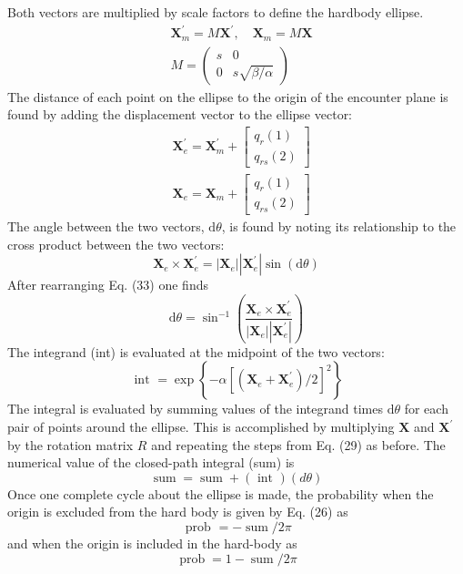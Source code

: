 \documentclass[10pt]{article}
\begin{document}
Both vectors are multiplied by scale factors to define the hardbody ellipse.
$$
\begin{aligned}
& \boldsymbol{X}_{m}^{\prime}=M \boldsymbol{X}^{\prime}, \quad \boldsymbol{X}_{m}=M \boldsymbol{X} \\
& M=\left(\begin{array}{cc}s & 0 \\0 & s \sqrt{\beta / \alpha}\end{array}\right)
\end{aligned}
$$
The distance of each point on the ellipse to the origin of the encounter plane is found by adding the displacement vector to the ellipse vector:
$$
\begin{aligned}
&\boldsymbol{X}_{e}^{\prime}=\boldsymbol{X}_{m}^{\prime}+\left[\begin{array}{c}
q_{r}(1) \\
q_{r s}(2)
\end{array}\right] \\
&\boldsymbol{X}_{e}=\boldsymbol{X}_{m}+\left[\begin{array}{c}
q_{r}(1) \\
q_{r s}(2)
\end{array}\right]
\end{aligned}
$$
The angle between the two vectors, $\mathrm{d} \theta$, is found by noting its relationship to the cross product between the two vectors:
$$
\boldsymbol{X}_{e} \times \boldsymbol{X}_{e}^{\prime}=\left|\boldsymbol{X}_{e}\right|\left|\boldsymbol{X}_{e}^{\prime}\right| \sin (\mathrm{d} \theta)
$$
After rearranging Eq. (33) one finds
$$
\mathrm{d} \theta=\sin ^{-1}\left(\frac{\boldsymbol{X}_{e} \times \boldsymbol{X}_{e}^{\prime}}{\left|\boldsymbol{X}_{e}\right|\left|\boldsymbol{X}_{e}^{\prime}\right|}\right)
$$
The integrand (int) is evaluated at the midpoint of the two vectors:
$$
\text { int }=\exp \left\{-\alpha\left[\left(\boldsymbol{X}_{e}+\boldsymbol{X}_{e}^{\prime}\right) / 2\right]^{2}\right\}
$$
The integral is evaluated by summing values of the integrand times $\mathrm{d} \theta$ for each pair of points around the ellipse. This is accomplished by multiplying $\boldsymbol{X}$ and $\boldsymbol{X}^{\prime}$ by the rotation matrix $R$ and repeating the steps from Eq. (29) as before. The numerical value of the closed-path integral (sum) is
$$
\operatorname{sum}=\operatorname{sum}+(\text { int })(d \theta)
$$
Once one complete cycle about the ellipse is made, the probability when the origin is excluded from the hard body is given by Eq. (26) as
$$
\text { prob }=-\operatorname{sum} / 2 \pi
$$
and when the origin is included in the hard-body as
$$
\operatorname{prob}=1-\operatorname{sum} / 2 \pi
$$
\end{document}
